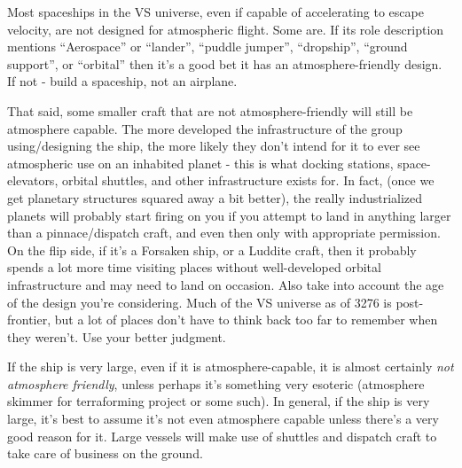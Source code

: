 \begin{itemize}
Most spaceships in the VS universe, even if capable of accelerating to
escape velocity, are not designed for atmospheric flight. Some are. If
its role description mentions ``Aerospace'' or ``lander'', ``puddle
jumper'', ``dropship'', ``ground support'', or ``orbital'' then it's a good
bet it has an atmosphere-friendly design. If not - build a spaceship,
not an airplane.

That said, some smaller craft that are not atmosphere-friendly will
still be atmosphere capable. The more developed the infrastructure of
the group using/designing the ship, the more likely they don't intend
for it to ever see atmospheric use on an inhabited planet - this is
what docking stations, space-elevators, orbital shuttles, and other
infrastructure exists for. In fact, (once we get planetary structures
squared away a bit better), the really industrialized planets will
probably start firing on you if you attempt to land in anything larger
than a pinnace/dispatch craft, and even then only with appropriate
permission. On the flip side, if it's a Forsaken ship, or a Luddite
craft, then it probably spends a lot more time visiting places without
well-developed orbital infrastructure and may need to land on
occasion. Also take into account the age of the design you're
considering. Much of the VS universe as of 3276 is post-frontier, but
a lot of places don't have to think back too far to remember when they
weren't. Use your better judgment.

If the ship is very large, even if it is atmosphere-capable, it is
almost certainly {\em not atmosphere friendly}, unless perhaps it's
something very esoteric (atmosphere skimmer for terraforming project
or some such). In general, if the ship is very large, it's best to
assume it's not even atmosphere capable unless there's a very good
reason for it. Large vessels will make use of shuttles and dispatch
craft to take care of business on the ground.

\end{itemize}






     

             
             
     


                  
               
                 
                 


 


 









